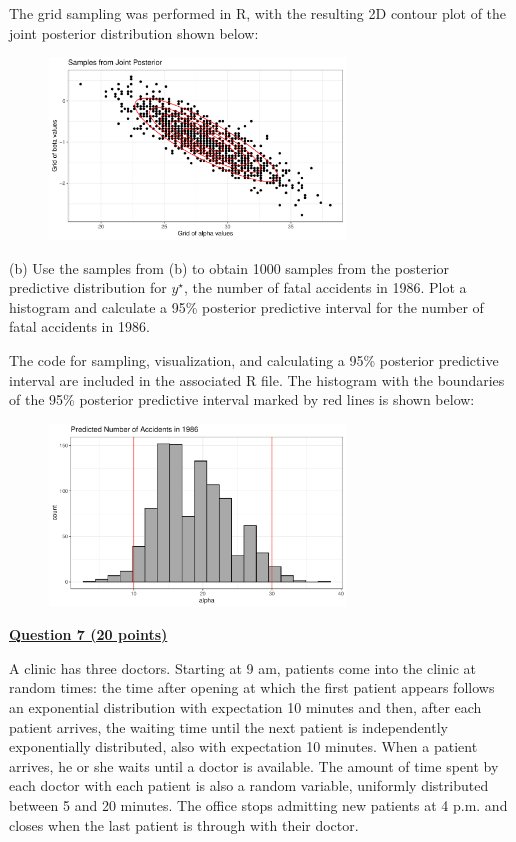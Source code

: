 \documentclass[12pt]{article}
\begin{document}
The grid sampling was performed in R, with the resulting 2D contour plot of the joint posterior distribution shown below:

\begin{figure}[h]
    \centering
    \includegraphics[width=0.7\textwidth]{q6a_plot.pdf}
\end{figure}

(b) Use the samples from (b) to obtain 1000 samples from the posterior predictive distribution for $y^\star$,
the number of fatal accidents in 1986.  Plot a histogram and calculate a 95\% posterior predictive interval
for the number of fatal accidents in 1986. 

The code for sampling, visualization, and calculating a 95\% posterior predictive interval are included in
the associated R file. The histogram with the boundaries of the 95\% posterior predictive interval marked
by red lines is shown below:

\begin{figure}[h]
    \centering
    \includegraphics[width=0.7\textwidth]{q6b_plot.pdf} \\
\end{figure}


\pagebreak

{\underline{\bf Question 7 (20 points)}}  

A clinic has three doctors. Starting at 9 am, patients come into the clinic at random times: the time after opening at which the first patient appears follows an exponential distribution with expectation 10 minutes and then, after each patient arrives, the waiting time until the next patient is independently exponentially distributed, also with expectation 10 minutes.   When a patient arrives, he or she waits until a doctor is available. The amount of time spent by each doctor with each patient is also a random variable, uniformly distributed between 5 and 20 minutes. The office stops admitting new patients at 4 p.m. and closes when the last patient is through with their doctor.
\end{document}
